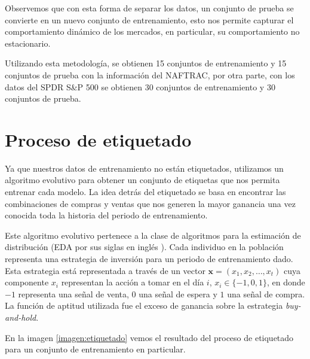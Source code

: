 \documentclass[12pt]{scrbook}
\theoremstyle{break}
\theoremstyle{break}
\newcommand{\buyhold}{\textit{buy-and-hold}}
\begin{document}
Observemos que con esta forma de separar los datos, un conjunto de prueba se convierte en un nuevo conjunto de entrenamiento, esto nos permite capturar el comportamiento dinámico de los mercados, en particular, su comportamiento no estacionario.

Utilizando esta metodología, se obtienen 15 conjuntos de entrenamiento y 15 conjuntos de prueba con la información del NAFTRAC, por otra parte, con los datos del SPDR S\&P 500 se obtienen 30 conjuntos de entrenamiento y 30 conjuntos de prueba.



\section{Proceso de etiquetado}
\label{seccion:proceso etiquetado}
Ya que nuestros datos de entrenamiento no están etiquetados, utilizamos un algoritmo evolutivo para obtener un conjunto de etiquetas que nos permita entrenar cada modelo. La idea detrás del etiquetado se basa en encontrar las combinaciones de compras y ventas que nos generen la mayor ganancia una vez conocida toda la historia del periodo de entrenamiento.

Este algoritmo evolutivo pertenece a la clase de algoritmos para la estimación de distribución (EDA por sus siglas en inglés \cite{simon2013evolutionary}). Cada individuo en la población representa una estrategia de inversión para un periodo de entrenamiento dado. Esta estrategia está representada a través de un vector $\mathbf{x} = (x_1, x_2, \ldots, x_t)$ cuya componente $x_i$ representan la acción a tomar en el día $i$, $x_i \in \{-1,0,1\}$, en donde $-1$ representa una señal de venta, $0$ una señal de espera y $1$ una señal de compra. La función de aptitud utilizada fue el exceso de ganancia sobre la estrategia \buyhold.

En la imagen \ref{imagen:etiquetado} vemos el resultado del proceso de etiquetado para un conjunto de entrenamiento en particular.
\end{document}
